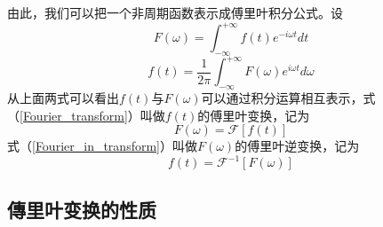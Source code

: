 	由此，我们可以把一个非周期函数表示成傅里叶积分公式。设
	\begin{equation}
	\label{Fourier_transform}
		F(\omega)=\int_{-\infty}^{+\infty}f(t)e^{-i\omega t}dt
	\end{equation}
	\begin{equation}
	\label{Fourier_in_transform}
		f(t)=\frac{1}{2\pi}\int_{-\infty}^{+\infty}F(\omega)e^{i\omega t}d\omega
	\end{equation}
	从上面两式可以看出$f(t)$与$F(\omega)$可以通过积分运算相互表示，式（\ref{Fourier_transform}）叫做$f(t)$的傅里叶变换，记为
	$$
		F(\omega)=\mathcal{F}[f(t)]
	$$
	式（\ref{Fourier_in_transform}）叫做$F(\omega)$的傅里叶逆变换，记为
	$$
		f(t)=\mathcal{F}^{-1}[F(\omega)]
	$$

\subsection{傳里叶变换的性质}
